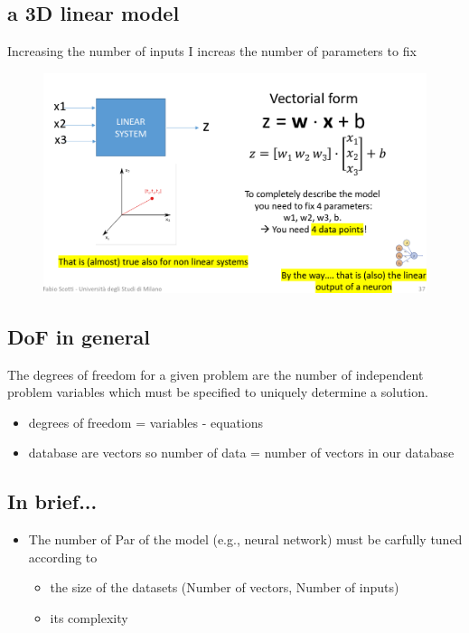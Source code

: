 \documentclass{report}
\begin{document}
\subsection{a 3D linear model}
Increasing the number of inputs I increas the number of parameters to fix
\begin{figure}[H]
    \centering
    \includegraphics[width=0.8\linewidth]{images/3d.png}
\end{figure}

\subsection{DoF in general}
\noindent The degrees of freedom for a given problem are the number of independent problem variables which must be specified to uniquely determine a solution.

\begin{itemize}
    \item degrees of freedom = variables - equations
    \item database are vectors so number of data = number of vectors in our database
\end{itemize}

\subsection{In brief...}
\begin{itemize}
    \item The number of Par of the model (e.g., neural network) must be carfully tuned according to
    \begin{itemize}
        \item the size of the datasets (Number of vectors, Number of inputs)
        \item its complexity 
    \end{itemize}
\end{itemize}
\end{document}
